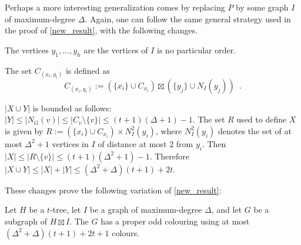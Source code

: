 \documentclass{patmorin}
\begin{document}
Perhaps a more interesting generalization comes by replacing $P$ by some graph $I$ of maximum-degree $\Delta$.  Again, one can follow the same general strategy used in the proof of \cref{new_result}, with the following changes.
\begin{compactitem}
  \item The vertices $y_1,\ldots,y_h$ are the vertices of $I$ is no particular order.
  \item The set $C_{(x_i,y_i)}$ is defined as
\[
    C_{(x_i,y_i)}:=(\{x_i\}\cup C_{x_i})\boxtimes (\{y_j\}\cup N_I(y_j)) \enspace .
\]
  \item $|X\cup Y|$ is bounded as follows: $|Y|\le|N_G(v)|\le |C_v\setminus\{v\}| \le (t+1)(\Delta+1)-1$.  The set $R$ used to define $X$ is given by $R:=(\{x_i\}\cup C_{x_i})\times N^2_I(y_i)$, where $N^2_I(y_i)$ denotes the set of at most $\Delta^2+1$ vertices in $I$ of distance at most $2$ from $y_i$.  Then $|X|\le|R\setminus\{v\}|\le (t+1)(\Delta^2+1)-1$.  Therefore $|X\cup Y|\le |X|+|Y|\le (\Delta^2+\Delta)(t+1)+2t$.
\end{compactitem}
These changes prove the following variation of \cref{new_result}:

\begin{thm}\label{new_result_delta}
  Let $H$ be a $t$-tree, let $I$ be a graph of maximum-degree $\Delta$, and let $G$ be a subgraph of $H\boxtimes I$.  The $G$ has a proper odd colouring using at most $(\Delta^2+\Delta)(t+1)+2t+1$ colours.
\end{thm}



%
%
%



\end{document}
